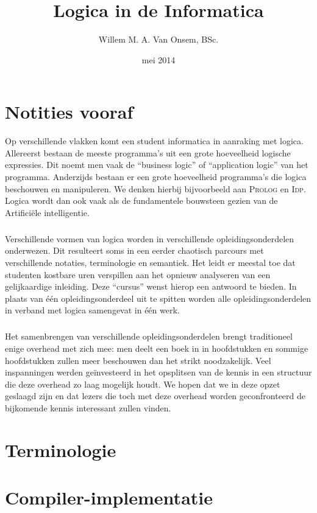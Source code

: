 \documentclass[titlepage,a4paper]{book}
\title{Logica in de Informatica}
\author{Willem M. A. Van Onsem, BSc.}
\date{mei 2014}
\newcommand{\prolog}{\textsc{Prolog}}
\newcommand{\idp}{\textsc{Idp}}
\begin{document}
\begin{titlepage}
\maketitle
\end{titlepage}
\chapter*{Notities vooraf}
Op verschillende vlakken komt een student informatica in aanraking met logica. Allereerst bestaan de meeste programma's uit een grote hoeveelheid logische expressies. Dit noemt men vaak de ``business logic'' of ``application logic'' van het programma. Anderzijds bestaan er een grote hoeveelheid programma's die logica beschouwen en manipuleren. We denken hierbij bijvoorbeeld aan \prolog{} en \idp{}. Logica wordt dan ook vaak als de fundamentele bouwsteen gezien van de Artifici\"ele intelligentie.
\paragraph{}
Verschillende vormen van logica worden in verschillende opleidingsonderdelen onderwezen. Dit resulteert soms in een eerder chaotisch parcours met verschillende notaties, terminologie en semantiek. Het leidt er meestal toe dat studenten kostbare uren verspillen aan het opnieuw analyseren van een gelijkaardige inleiding. Deze ``cursus'' wenst hierop een antwoord te bieden. In plaats van \'e\'en opleidingsonderdeel uit te spitten worden alle opleidingsonderdelen in verband met logica samengevat in \'e\'en werk.
\paragraph{}
Het samenbrengen van verschillende opleidingsonderdelen brengt traditioneel enige overhead met zich mee: men deelt een boek in in hoofdstukken en sommige hoofdstukken zullen meer beschouwen dan het strikt noodzakelijk. Veel inspanningen werden ge\"investeerd in het opsplitsen van de kennis in een structuur die deze overhead zo laag mogelijk houdt. We hopen dat we in deze opzet geslaagd zijn en dat lezers die toch met deze overhead worden geconfronteerd de bijkomende kennis interessant zullen vinden.
\chapter{Terminologie}

\chapter{Compiler-implementatie}
\end{document}
